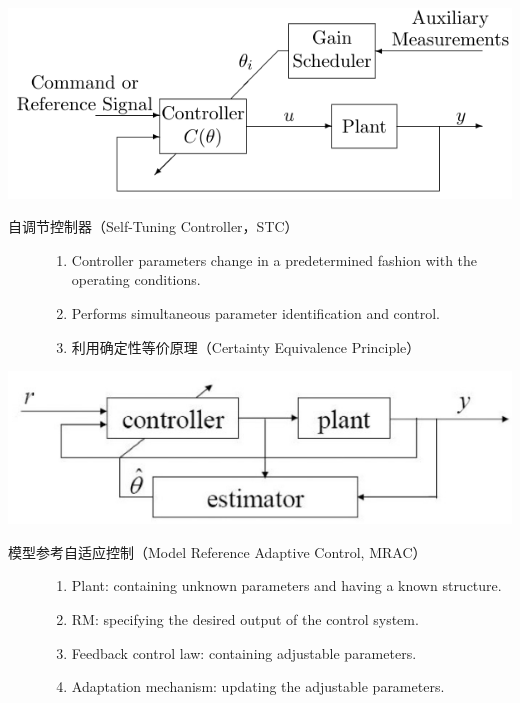   \begin{center}
  \includegraphics[scale=0.5]{figure/adaptive/gain_scheduling.png}
\end{center}
  \begin{description}
    \item[自调节控制器（Self-Tuning Controller，STC）]
    \begin{enumerate}
      \item Controller parameters change in a predetermined fashion with the
      operating conditions.
      
      \item Performs simultaneous parameter identification and control.
      
      \item 利用确定性等价原理（Certainty Equivalence Principle）
    \end{enumerate}
  \end{description}
  \begin{center}
  \includegraphics[scale=0.5]{figure/adaptive/stc.png}
\end{center}
  \begin{description}
    \item[模型参考自适应控制（Model Reference Adaptive Control, MRAC）]
    \begin{enumerate}
      \item Plant: containing unknown parameters and having a known structure.
      
      \item RM: specifying the desired output of the control system.
      
      \item Feedback control law: containing adjustable parameters.
      
      \item Adaptation mechanism: updating the adjustable parameters.
    \end{enumerate}
  \end{description}
